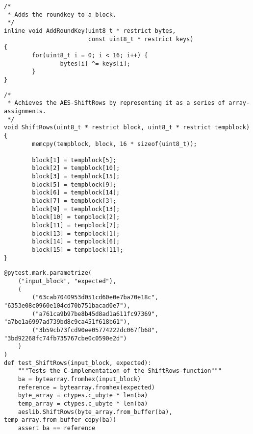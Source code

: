 \begin{lstlisting}
/*
 * Adds the roundkey to a block.
 */
inline void AddRoundKey(uint8_t * restrict bytes, 
                        const uint8_t * restrict keys)
{
        for(uint8_t i = 0; i < 16; i++) {
                bytes[i] ^= keys[i];
        }
}
\end{lstlisting}

\begin{lstlisting}
/*
 * Achieves the AES-ShiftRows by representing it as a series of array-assignments.
 */
void ShiftRows(uint8_t * restrict block, uint8_t * restrict tempblock)
{
        memcpy(tempblock, block, 16 * sizeof(uint8_t));

        block[1] = tempblock[5];
        block[2] = tempblock[10];
        block[3] = tempblock[15];
        block[5] = tempblock[9];
        block[6] = tempblock[14];
        block[7] = tempblock[3];
        block[9] = tempblock[13];
        block[10] = tempblock[2];
        block[11] = tempblock[7];
        block[13] = tempblock[1];
        block[14] = tempblock[6];
        block[15] = tempblock[11];
}
\end{lstlisting}

\begin{lstlisting}
@pytest.mark.parametrize(
    ("input_block", "expected"),
    (
        ("63cab7040953d051cd60e0e7ba70e18c", "6353e08c0960e104cd70b751bacad0e7"),
        ("a761ca9b97be8b45d8ad1a611fc97369", "a7be1a6997ad739bd8c9ca451f618b61"),
        ("3b59cb73fcd90ee05774222dc067fb68", "3bd92268fc74fb735767cbe0c0590e2d")
    )
)
def test_ShiftRows(input_block, expected):
    """Tests the C-implementation of the ShiftRows-function"""
    ba = bytearray.fromhex(input_block)
    reference = bytearray.fromhex(expected)
    byte_array = ctypes.c_ubyte * len(ba)
    temp_array = ctypes.c_ubyte * len(ba)
    aeslib.ShiftRows(byte_array.from_buffer(ba), temp_array.from_buffer_copy(ba))
    assert ba == reference
\end{lstlisting}

